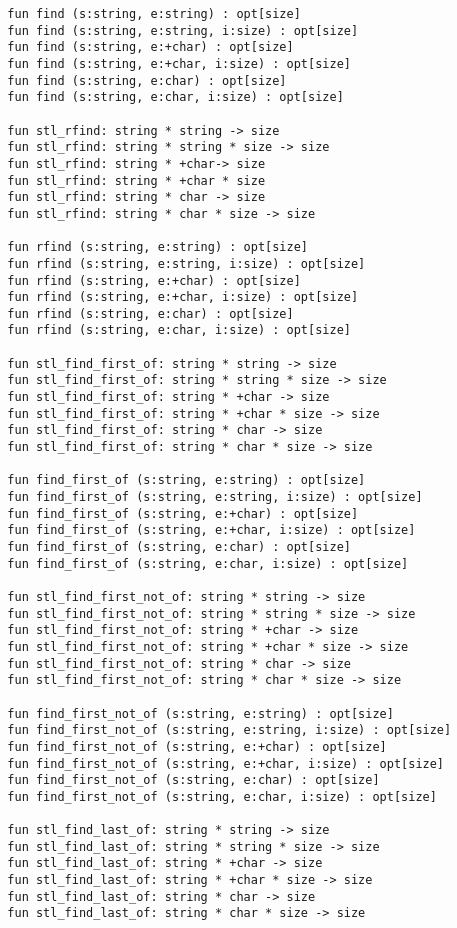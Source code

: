 \documentclass[oneside]{book}
\begin{document}
{\begin{verbatim}
  fun find (s:string, e:string) : opt[size] 
  fun find (s:string, e:string, i:size) : opt[size]
  fun find (s:string, e:+char) : opt[size]
  fun find (s:string, e:+char, i:size) : opt[size]
  fun find (s:string, e:char) : opt[size]
  fun find (s:string, e:char, i:size) : opt[size]

  fun stl_rfind: string * string -> size
  fun stl_rfind: string * string * size -> size
  fun stl_rfind: string * +char-> size
  fun stl_rfind: string * +char * size
  fun stl_rfind: string * char -> size
  fun stl_rfind: string * char * size -> size

  fun rfind (s:string, e:string) : opt[size]
  fun rfind (s:string, e:string, i:size) : opt[size]
  fun rfind (s:string, e:+char) : opt[size]
  fun rfind (s:string, e:+char, i:size) : opt[size]
  fun rfind (s:string, e:char) : opt[size]
  fun rfind (s:string, e:char, i:size) : opt[size]

  fun stl_find_first_of: string * string -> size
  fun stl_find_first_of: string * string * size -> size
  fun stl_find_first_of: string * +char -> size
  fun stl_find_first_of: string * +char * size -> size
  fun stl_find_first_of: string * char -> size
  fun stl_find_first_of: string * char * size -> size

  fun find_first_of (s:string, e:string) : opt[size]
  fun find_first_of (s:string, e:string, i:size) : opt[size]
  fun find_first_of (s:string, e:+char) : opt[size]
  fun find_first_of (s:string, e:+char, i:size) : opt[size]
  fun find_first_of (s:string, e:char) : opt[size]
  fun find_first_of (s:string, e:char, i:size) : opt[size]

  fun stl_find_first_not_of: string * string -> size
  fun stl_find_first_not_of: string * string * size -> size
  fun stl_find_first_not_of: string * +char -> size
  fun stl_find_first_not_of: string * +char * size -> size
  fun stl_find_first_not_of: string * char -> size
  fun stl_find_first_not_of: string * char * size -> size

  fun find_first_not_of (s:string, e:string) : opt[size]
  fun find_first_not_of (s:string, e:string, i:size) : opt[size]
  fun find_first_not_of (s:string, e:+char) : opt[size]
  fun find_first_not_of (s:string, e:+char, i:size) : opt[size]
  fun find_first_not_of (s:string, e:char) : opt[size]
  fun find_first_not_of (s:string, e:char, i:size) : opt[size]

  fun stl_find_last_of: string * string -> size
  fun stl_find_last_of: string * string * size -> size
  fun stl_find_last_of: string * +char -> size
  fun stl_find_last_of: string * +char * size -> size
  fun stl_find_last_of: string * char -> size
  fun stl_find_last_of: string * char * size -> size


\end{verbatim}}
\end{document}
